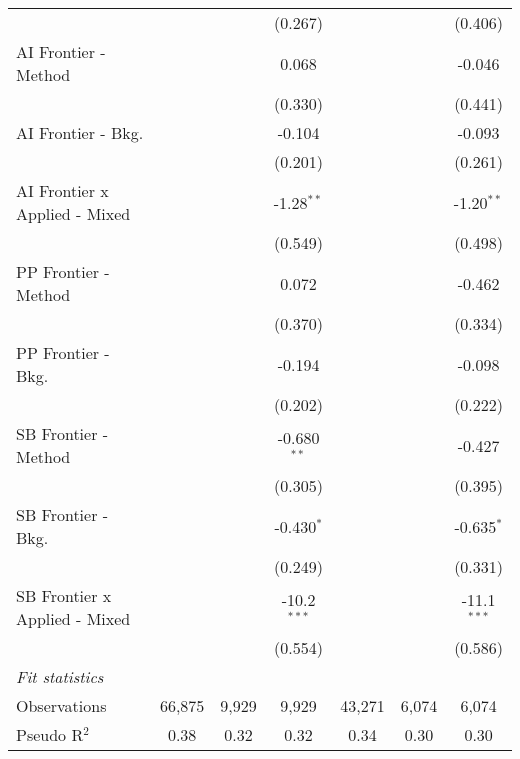 \begin{tabular}{lcccccc}
                                 &         &         & (0.267)       &         &         & (0.406)\\   
   AI Frontier - Method          &         &         & 0.068         &         &         & -0.046\\   
                                 &         &         & (0.330)       &         &         & (0.441)\\   
   AI Frontier - Bkg.            &         &         & -0.104        &         &         & -0.093\\   
                                 &         &         & (0.201)       &         &         & (0.261)\\   
   AI Frontier x Applied - Mixed &         &         & -1.28$^{**}$  &         &         & -1.20$^{**}$\\   
                                 &         &         & (0.549)       &         &         & (0.498)\\   
   PP Frontier - Method          &         &         & 0.072         &         &         & -0.462\\   
                                 &         &         & (0.370)       &         &         & (0.334)\\   
   PP Frontier - Bkg.            &         &         & -0.194        &         &         & -0.098\\   
                                 &         &         & (0.202)       &         &         & (0.222)\\   
   SB Frontier - Method          &         &         & -0.680$^{**}$ &         &         & -0.427\\   
                                 &         &         & (0.305)       &         &         & (0.395)\\   
   SB Frontier - Bkg.            &         &         & -0.430$^{*}$  &         &         & -0.635$^{*}$\\   
                                 &         &         & (0.249)       &         &         & (0.331)\\   
   SB Frontier x Applied - Mixed &         &         & -10.2$^{***}$ &         &         & -11.1$^{***}$\\   
                                 &         &         & (0.554)       &         &         & (0.586)\\   
   \midrule
   \emph{Fit statistics}\\
   Observations                  & 66,875  & 9,929   & 9,929         & 43,271  & 6,074   & 6,074\\  
   Pseudo R$^2$                  & 0.38    & 0.32    & 0.32          & 0.34    & 0.30    & 0.30\\  
   

\end{tabular}
